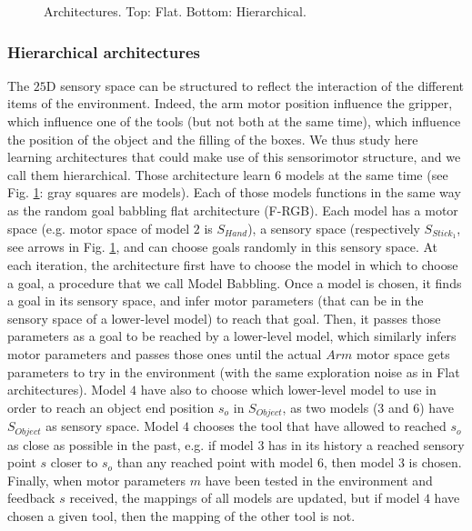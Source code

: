 \documentclass[10pt,letterpaper]{article}
\begin{document}
			\begin{figure}[t]
				\center
				
				\vspace{-0.25cm}
				
				\vspace{-0.5cm}
				\caption{Architectures. Top: Flat. Bottom: Hierarchical.}
				\label{Architectures}					
			\end{figure}
				
		
		\subsubsection{Hierarchical architectures}
			
			The $25$D sensory space can be structured to reflect the interaction of the different items of the environment.
			Indeed, the arm motor position influence the gripper, which influence one of the tools (but not both at the same time), which influence the position of the object and the filling of the boxes.
			We thus study here learning architectures that could make use of this sensorimotor structure, and we call them hierarchical.
			Those architecture learn $6$ models at the same time (see Fig. \ref{Architectures}: gray squares are models). 
			Each of those models functions in the same way as the random goal babbling flat architecture (F-RGB). 
			Each model has a motor space (e.g. motor space of model $2$ is $S_{Hand}$), a sensory space (respectively $S_{Stick_1}$, see arrows in Fig. \ref{Architectures}, and can choose goals randomly in this sensory space.
			At each iteration, the architecture first have to choose the model in which to choose a goal, a procedure that we call Model Babbling.
			Once a model is chosen, it finds a goal in its sensory space, and infer motor parameters (that can be in the sensory space of a lower-level model) to reach that goal.
			Then, it passes those parameters as a goal to be reached by a lower-level model, 
			which similarly infers motor parameters and passes those ones until the actual $Arm$ motor space gets parameters to try in the environment (with the same exploration noise as in Flat architectures).
			Model $4$ have also to choose which lower-level model to use in order to reach an object end position $s_o$ in $S_{Object}$, as two models ($3$ and $6$) have $S_{Object}$ as sensory space. 
			Model $4$ chooses the tool that have allowed to reached $s_o$ as close as possible in the past, e.g. if model $3$ has in its history a reached sensory
			point $s$ closer to $s_o$ than any reached point with model $6$, then model $3$ is chosen.
			Finally, when motor parameters $m$ have been tested in the environment and feedback $s$ received, the mappings of all models are updated, but if model $4$ have chosen a given tool, then the mapping of the other tool is not.\\
			
\end{document}
